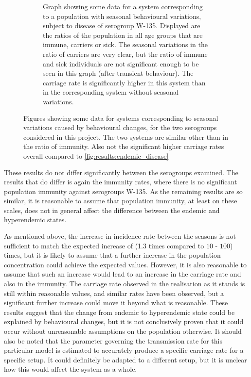 \documentclass[10pt,a4paper]{article}
\begin{document}
\begin{figure}
\begin{subfigure}{0.45\textwidth}
		\caption{Graph showing some data for a system corresponding to a population with seasonal behavioural variations, subject to disease of serogroup W-135. Displayed are the ratios of the population in all age groups that are immune, carriers or sick. The seasonal variations in the ratio of carriers are very clear, but the ratio of immune and sick individuals are not significant enough to be seen in this graph (after transient behaviour). The carriage rate is significantly higher in this system than in the corresponding system without seasonal variations.} \label{fig:results:seasonal_disease_W135}
	\end{subfigure}
	\caption{Figures showing some data for systems corresponding to seasonal variations caused by behavioural changes, for the two serogroups considered in this project. The two systems are similar other than in the ratio of immunity. Also not the significant higher carriage rates overall compared to \cref{fig:results:endemic_disease}} \label{fig:results:seasonal_disease}
\end{figure}

These results do not differ significantly between the serogroups examined. The results that do differ is again the immunity rates, where there is no significant population immunity against serogroups W-135. As the remaining results are so similar, it is reasonable to assume that population immunity, at least on these scales, does not in general affect the difference between the endemic and hyperendemic states.

As mentioned above, the increase in incidence rate between the seasons is not sufficient to match the expected increase of (1.3 times compared to $10$ - $100$) times, but it is likely to assume that a further increase in the population concentration could achieve the expected values. However, it is also reasonable to assume that such an increase would lead to an increase in the carriage rate and also in the immunity. The carriage rate observed in the realisation as it stands is still within reasonable values, and similar rates have been observed, but a significant further increase could move it beyond what is reasonable. These results suggest that the change from endemic to hyperendemic state could be explained by behavioural changes, but it is not conclusively proven that it could occur without unreasonable assumptions on the population otherwise. It should also be noted that the parameter governing the transmission rate for this particular model is estimated to accurately produce a specific carriage rate for a specific setup. It could definitely be adapted to a different setup, but it is unclear how this would affect the system as a whole.
\end{document}

